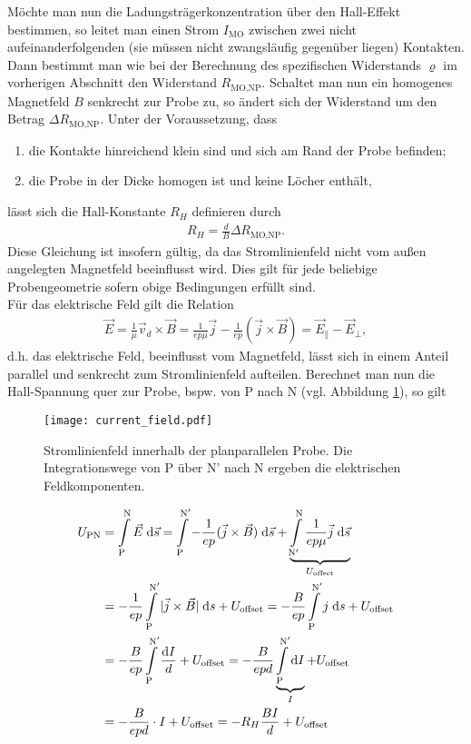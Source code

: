 Möchte man nun die Ladungsträgerkonzentration über den Hall-Effekt bestimmen, so leitet man einen Strom $I_\text{MO}$ zwischen zwei nicht aufeinanderfolgenden (sie müssen nicht zwangsläufig gegenüber liegen) Kontakten. Dann bestimmt man wie bei der Berechnung des spezifischen Widerstands $\varrho$ im vorherigen Abschnitt den Widerstand $R_\text{MO,NP}$. Schaltet man nun ein homogenes Magnetfeld $B$ senkrecht zur Probe zu, so ändert sich der Widerstand um den Betrag $\Delta R_\text{MO,NP}$. Unter der Voraussetzung, dass
\begin{enumerate}
\item die Kontakte hinreichend klein sind und sich am Rand der Probe befinden;
\item die Probe in der Dicke homogen ist und keine Löcher enthält,
\end{enumerate}
lässt sich die Hall-Konstante $R_H$ definieren durch
\begin{align}
R_H=\frac{d}{B}\Delta R_\text{MO,NP}.
\end{align}
Diese Gleichung ist insofern gültig, da das Stromlinienfeld nicht vom außen angelegten Magnetfeld beeinflusst wird. Dies gilt für jede beliebige Probengeometrie sofern obige Bedingungen erfüllt sind.\\
Für das elektrische Feld gilt die Relation
\begin{align}
\vec{E}=\frac{1}{\mu}\vec{v}_d\times \vec{B}=\frac{1}{ep\mu}\vec{j}-\frac{1}{ep}(\vec{j}\times \vec{B})=\vec{E}_{\parallel}-\vec{E}_{\perp},
\end{align}
d.h. das elektrische Feld, beeinflusst vom Magnetfeld, lässt sich in einem Anteil parallel und senkrecht zum Stromlinienfeld aufteilen. Berechnet man nun die Hall-Spannung quer zur Probe, bspw. von P nach N (vgl. Abbildung \ref{fig:current_field}), so gilt
\begin{figure}[h]
\centering
\texttt{[image: current\_field.pdf]}
\caption{Stromlinienfeld innerhalb der planparallelen Probe. Die Integrationswege von P über N' nach N ergeben die elektrischen Feldkomponenten.}
\label{fig:current_field}
\end{figure}
\begin{align}
U_\text{PN}&=\int\limits_{\mathrm{P}}^{\mathrm{N}}\vec{E}\;\mathrm{d} \vec{s}=\int\limits_{\mathrm{P}}^{\mathrm{N}^\prime}-\frac{1}{ep}(\vec{j}\times \vec{B})\;\mathrm{d} \vec{s}+\underbrace{\int\limits_{\mathrm{N}^\prime}^{\mathrm{N}}\frac{1}{ep\mu}\vec{j}\;\mathrm{d} \vec{s}}_{U_\text{offset}}\notag\\
&=-\frac{1}{ep}\int\limits_{\mathrm{P}}^{\mathrm{N}^\prime}|\vec{j}\times\vec{B}|\;\mathrm{d} s+U_\text{offset}=-\frac{B}{ep}\int\limits_{\mathrm{P}}^{\mathrm{N}^\prime}j\;\mathrm{d} s+U_\text{offset}\notag\\
&=-\frac{B}{ep}\int\limits_{\mathrm{P}}^{\mathrm{N}^\prime}\frac{\mathrm{d} I}{d}+U_\text{offset}=-\frac{B}{epd}\underbrace{\int\limits_{\mathrm{P}}^{\mathrm{N}^\prime}\mathrm{d} I}_{I}+U_\text{offset}\notag\\
&=-\frac{B}{epd}\cdot I +U_\text{offset}=-R_H\frac{BI}{d}+U_\text{offset}
\end{align}
